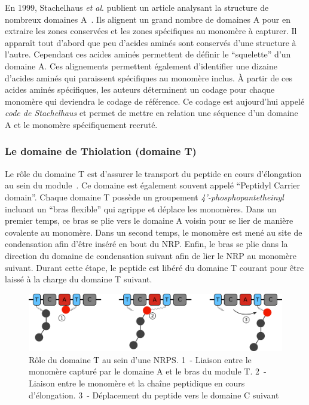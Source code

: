 En 1999, Stachelhaus \textit{et al}. publient un article analysant la structure de nombreux domaines A~\cite{stachelhaus_specificity-conferring_1999}.
Ils alignent un grand nombre de domaines A pour en extraire les zones conservées et les zones spécifiques au monomère à capturer.
Il apparaît tout d'abord que peu d'acides aminés sont conservés d'une structure à l'autre.
Cependant ces acides aminés permettent de définir le ``squelette'' d'un domaine A.
Ces alignements permettent également d'identifier une dizaine d'acides aminés qui paraissent spécifiques au monomère inclus.
À partir de ces acides aminés spécifiques, les auteurs déterminent un codage pour chaque monomère qui deviendra le codage de référence.
Ce codage est aujourd'hui appelé \textit{code de Stachelhaus} et permet de mettre en relation une séquence d'un domaine A et le monomère spécifiquement recruté.


\subsubsection{Le domaine de Thiolation (domaine T)}

Le rôle du domaine T est d'assurer le transport du peptide en cours d'élongation au sein du module~\cite{stachelhaus_biochemical_1996,calcott_portability_2015}.
Ce domaine est également souvent appelé ``Peptidyl Carrier domain''.
Chaque domaine T possède un groupement \textit{4’-phosphopantetheinyl} incluant un ``bras flexible'' qui agrippe et déplace les monomères.
Dans un premier temps, ce bras se plie vers le domaine A voisin pour se lier de manière covalente au monomère.
Dans un second temps, le monomère est mené au site de condensation afin d'être inséré en bout du NRP.
Enfin, le bras se plie dans la direction du domaine de condensation suivant afin de lier le NRP au monomère suivant.
Durant cette étape, le peptide est libéré du domaine T courant pour être laissé à la charge du domaine T suivant.

\begin{figure}[h!]
  \begin{center}
    \includegraphics[width=450px]{Figures/bio/Intro/T-domain.png}
    \caption{\label{T_domain}Rôle du domaine T au sein d'une NRPS.
    1~- Liaison entre le monomère capturé par le domaine A et le bras du module T.
    2~- Liaison entre le monomère et la chaîne peptidique en cours d'élongation.
    3~- Déplacement du peptide vers le domaine C suivant}
  \end{center}
\end{figure}

